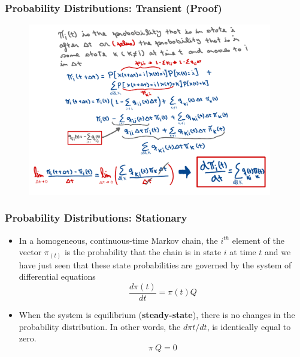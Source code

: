 \begin{frame}
    \frametitle{Probability Distributions: Transient (Proof)}
    \begin{figure}
        \centering
        \includegraphics[width=0.95\textwidth]{slides/figures/ctmc_transient_proof.pdf}
    \end{figure}
\end{frame}


\begin{frame}
    \frametitle{Probability Distributions: Stationary}

        \begin{itemize}
            \item In a homogeneous, continuous-time Markov chain, the $i^{th}$ element of the vector $\pi_(t)$ is 
            the probability that the chain is in state $i$ at time $t$ and we have just seen that these state
            probabilities are governed by the system of differential equations
            $$\frac{d\pi(t)}{dt} = \pi(t)Q$$

            \item When the system is equilibrium (\textbf{steady-state}), there is no changes in the probability 
            distribution. In other words, the $d\pi{t}/dt$, is identically equal to zero.
            $$\pi~Q = 0$$
        \end{itemize}
\end{frame}


